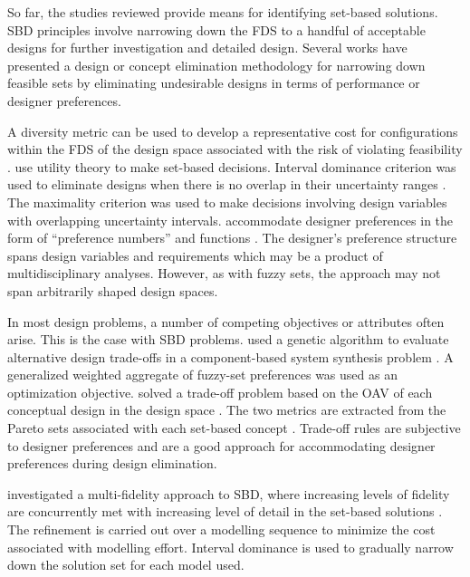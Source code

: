 So far, the studies reviewed provide means for identifying set-based solutions. \ac{SBD} principles involve narrowing down the \ac{FDS} to a handful of acceptable designs for further investigation and detailed design. Several works have presented a design or concept elimination methodology for narrowing down feasible sets by eliminating undesirable designs in terms of performance or designer preferences.

A diversity metric can be used to develop a representative cost for configurations within the \ac{FDS} of the design space associated with the risk of violating feasibility \cite{Doerry2014}. \citeauthor{Malak2009} use utility theory to make set-based decisions. Interval dominance criterion was used to eliminate designs when there is no overlap in their uncertainty ranges \cite{Malak2009}. The maximality criterion was used to make decisions involving design variables with overlapping uncertainty intervals. \citeauthor{Nahm2005} accommodate designer preferences in the form of ``preference numbers'' and functions \cite{Nahm2005}. The designer's preference structure spans design variables and requirements which may be a product of multidisciplinary analyses. However, as with fuzzy sets, the approach may not span arbitrarily shaped design spaces.

In most design problems, a number of competing objectives or attributes often arise. This is the case with \ac{SBD} problems. \citeauthor{Jiachuan2003} used a genetic algorithm to evaluate alternative design trade-offs in a component-based system synthesis problem \cite{Jiachuan2003}. A generalized weighted aggregate of fuzzy-set preferences was used as an optimization objective. \citeauthor{Avigad2009b} solved a trade-off problem based on the \ac{OAV} of each conceptual design in the design space \cite{Avigad2009b}. The two metrics are extracted from the Pareto sets associated with each set-based concept \cite{Avigad2009b}. Trade-off rules are subjective to designer preferences and are a good approach for accommodating designer preferences during design elimination.

\citeauthor{Miller2018} investigated a multi-fidelity approach to \ac{SBD}, where increasing levels of fidelity are concurrently met with increasing level of detail in the set-based solutions \cite{Miller2018}. The refinement is carried out over a modelling sequence to minimize the cost associated with modelling effort. Interval dominance is used to gradually narrow down the solution set for each model used.


